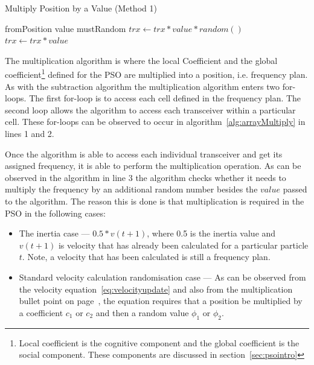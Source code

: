 \begin{algorithm}[H]
\caption{Multiply Position by a Value (Method 1)}
\label{alg:arrayMultiply}
\begin{algorithmic}[1]
	\Require fromPosition
	\Require value
	\Require mustRandom
				\State $trx \leftarrow trx * value * random()$
			\Else
				\State $trx \leftarrow trx * value$
			\EndIf
		\EndFor
	\EndFor
\end{algorithmic}
\end{algorithm}

The multiplication algorithm is where the local Coefficient and the global coefficient\footnote{Local coefficient is the cognitive component and the global coefficient is the social component. These components are discussed in section~\ref{sec:psointro}} defined for the \gls{PSO} are multiplied into a position, i.e. frequency plan. As with the subtraction algorithm the multiplication algorithm enters two for-loops. The first for-loop is to access each cell defined in the frequency plan. The second loop allows the algorithm to access each transceiver within a particular cell. These for-loops can be observed to occur in algorithm~\ref{alg:arrayMultiply} in lines 1 and 2.

Once the algorithm is able to access each individual transceiver and get its assigned frequency, it is able to perform the multiplication operation. As can be observed in the algorithm in line 3 the algorithm checks whether it needs to multiply the frequency by an additional random number besides the $value$ passed to the algorithm. The reason this is done is that multiplication is required in the \gls{PSO} in the following cases:

\begin{itemize}
\item The inertia case --- $0.5 * v(t+1)$, where 0.5 is the inertia value and $v(t+1)$ is velocity that has already been calculated for a particular particle $t$. Note, a velocity that has been calculated is still a frequency plan.
\item Standard velocity calculation randomisation case --- As can be observed from the velocity equation~\ref{eq:velocityupdate} and also from the multiplication bullet point on page~\pageref{lst:velocitybreakup}, the equation requires that a position be multiplied by a coefficient $c_1$ or $c_2$ and then a random value $\phi_1$ or $\phi_2$. 
\end{itemize}

